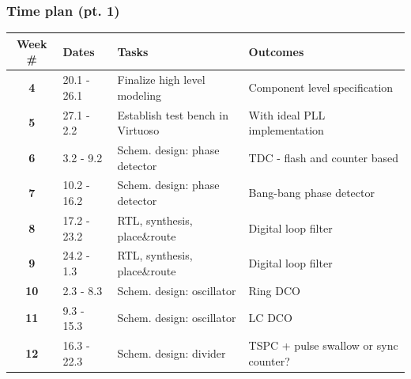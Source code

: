\documentclass[t, screen, aspectratio=43]{beamer}
\begin{document}
\begin{frame}
	\frametitle{Time plan (pt. 1)}
	\begin{table}[htb!]
		\tiny
		\centering
		\vspace{-1em}
		\def\arraystretch{1.5}		
		\setlength\arrayrulewidth{0.75pt}
		\setlength{\tabcolsep}{1em} %
		\begin{tabular}{|c|l|l|l|}
			\hline 
			\rule[-1ex]{0pt}{2.5ex}\cellcolor{gray!40}\textbf{Week \#} & \cellcolor{gray!40}\textbf{Dates} &\cellcolor{gray!40}\textbf{Tasks} & \cellcolor{gray!40}\textbf{Outcomes}\\ 
			\hline 
			\rule[-1ex]{0pt}{2.5ex}\cellcolor{red!40}\textbf{4}&\cellcolor{red!40}20.1 - 26.1 &\cellcolor{red!40}Finalize high level modeling &\cellcolor{red!40}Component level specification\\ 
			\hline 
			\rule[-1ex]{0pt}{2.5ex}\textbf{5}\cellcolor{red!40}&\cellcolor{red!40}27.1 - 2.2 &\cellcolor{red!40}Establish test bench in Virtuoso &\cellcolor{red!40}With ideal PLL implementation\\ 
			\hline 
			\rule[-1ex]{0pt}{2.5ex}\cellcolor{red!40}\textbf{6}&\cellcolor{red!40}3.2 - 9.2&\cellcolor{red!40}Schem. design: phase detector &\cellcolor{red!40}TDC - flash and counter based \\ 
			\hline 
			\rule[-1ex]{0pt}{2.5ex}\cellcolor{red!40}\textbf{7}&\cellcolor{red!40}10.2 - 16.2&\cellcolor{red!40}Schem. design: phase detector &\cellcolor{red!40}Bang-bang phase detector\\ 
			\hline 
			\rule[-1ex]{0pt}{2.5ex}\cellcolor{green!40}\textbf{8}&\cellcolor{green!40}17.2 - 23.2&\cellcolor{green!40}RTL, synthesis, place\&route &\cellcolor{green!40}Digital loop filter\\ 
			\hline 
			\rule[-1ex]{0pt}{2.5ex}\textbf{9}&24.2 - 1.3& RTL, synthesis, place\&route & Digital loop filter\\ 
			\hline 
			\rule[-1ex]{0pt}{2.5ex}\textbf{10}&2.3 - 8.3& Schem. design: oscillator & Ring DCO\\ 
			\hline 
			\rule[-1ex]{0pt}{2.5ex}\textbf{11}&9.3 - 15.3& Schem. design: oscillator & LC DCO\\ 
			\hline 
			\rule[-1ex]{0pt}{2.5ex}\textbf{12}&16.3 - 22.3& Schem. design: divider  &TSPC + pulse swallow or sync counter?\\ 

\end{tabular}
\end{table}
\end{frame}
\end{document}
